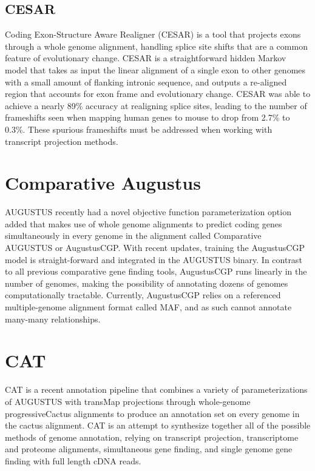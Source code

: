 \documentclass[fleqn,10pt]{wlscirep}
\begin{document}
\subsection*{CESAR}
Coding Exon-Structure Aware Realigner (CESAR) \cite{sharma2016coding} is a tool that projects exons through a whole genome alignment, handling splice site shifts that are a common feature of evolutionary change. CESAR is a straightforward hidden Markov model that takes as input the linear alignment of a single exon to other genomes with a small amount of flanking intronic sequence, and outputs a re-aligned region that accounts for exon frame and evolutionary change. CESAR was able to achieve a nearly 89\% accuracy at realigning splice sites, leading to the number of frameshifts seen when mapping human genes to mouse to drop from 2.7\% to 0.3\%. These spurious frameshifts must be addressed when working with transcript projection methods.

\section*{Comparative Augustus}
AUGUSTUS recently had a novel objective function parameterization option added that makes use of whole genome alignments to predict coding genes simultaneously in every genome in the alignment \cite{konig2015simultaneous} called Comparative AUGUSTUS or AugustusCGP. With recent updates, training the AugustusCGP model is straight-forward and integrated in the AUGUSTUS binary. In contrast to all previous comparative gene finding tools, AugustusCGP runs linearly in the number of genomes, making the possibility of annotating dozens of genomes computationally tractable. Currently, AugustusCGP relies on a referenced multiple-genome alignment format called MAF, and as such cannot annotate many-many relationships.

\section*{CAT}
CAT is a recent annotation pipeline that combines a variety of parameterizations of AUGUSTUS with transMap projections through whole-genome progressiveCactus alignments to produce an annotation set on every genome in the cactus alignment. CAT is an attempt to synthesize together all of the possible methods of genome annotation, relying on transcript projection, transcriptome and proteome alignments, simultaneous gene finding, and single genome gene finding with full length cDNA reads. 
\end{document}
